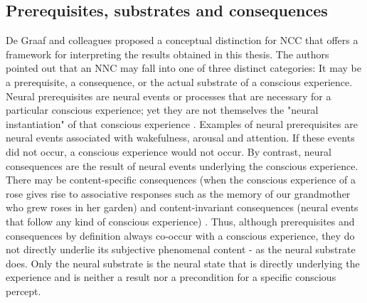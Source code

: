 \subsection{Prerequisites, substrates and consequences}
De Graaf and colleagues \parencite*{DeGraaf2012} proposed a conceptual distinction for NCC that offers a framework for interpreting the results obtained in this thesis. The authors pointed out that an NNC may fall into one of three distinct categories: It may be a prerequisite, a consequence, or the actual substrate of a conscious experience. Neural prerequisites are neural events or processes that are necessary for a particular conscious experience; yet they are not themselves the "neural instantiation" of that conscious experience \parencite{DeGraaf2012}. Examples of neural prerequisites are neural events associated with wakefulness, arousal and attention. If these events did not occur, a conscious experience would not occur. By contrast, neural consequences are the result of neural events underlying the conscious experience. There may be content-specific consequences (when the conscious experience of a rose gives rise to associative responses such as the memory of our grandmother who grew roses in her garden) and content-invariant consequences (neural events that follow any kind of conscious experience) \parencite{DeGraaf2012}. Thus, although prerequisites and consequences by definition always co-occur with a conscious experience, they do not directly underlie its subjective phenomenal content - as the neural substrate does. Only the neural substrate is the neural state that is directly underlying the experience and is neither a result nor a precondition for a specific conscious percept.

